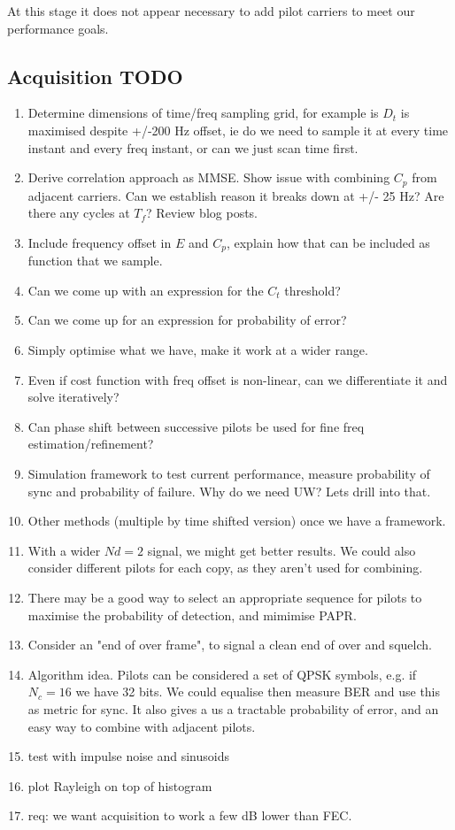 \documentclass{article}
\begin{document}
At this stage it does not appear necessary to add pilot carriers to meet our performance goals.

\subsection{Acquisition TODO}

\begin{enumerate}
\item Determine dimensions of time/freq sampling grid, for example is $D_t$ is maximised despite +/-200 Hz offset, ie do we need to sample it at every time instant and every freq instant, or can we just scan time first.
\item Derive correlation approach as MMSE.  Show issue with combining $C_p$ from adjacent carriers. Can we establish reason it breaks down at +/- 25 Hz?  Are there any cycles at $T_f$?  Review blog posts.
\item Include frequency offset in $E$ and $C_p$, explain how that can be included as function that we sample.
\item Can we come up with an expression for the $C_t$ threshold?
\item Can we come up for an expression for probability of error?
\item Simply optimise what we have, make it work at a wider range.
\item Even if cost function with freq offset is non-linear, can we differentiate it and solve iteratively?
\item Can phase shift between successive pilots be used for fine freq estimation/refinement?
\item Simulation framework to test current performance, measure probability of sync and probability of failure.  Why do we need UW?  Lets drill into that.
\item Other methods (multiple by time shifted version) once we have a framework.
\item With a wider $Nd=2$ signal, we might get better results.  We could also consider different pilots for each copy, as they aren't used for combining.
\item There may be a good way to select an appropriate sequence for pilots to maximise the probability of detection, and mimimise PAPR.
\item Consider an "end of over frame", to signal a clean end of over and squelch.
\item Algorithm idea. Pilots can be considered a set of QPSK symbols, e.g. if $N_c=16$ we have 32 bits. We could equalise then measure BER and use this as metric for sync.  It also gives a us a tractable probability of error, and an easy way to combine with adjacent pilots.
\item test with impulse noise and sinusoids
\item plot Rayleigh on top of histogram
\item req: we want acquisition to work a few dB lower than FEC.
\end{enumerate}
\end{document}

